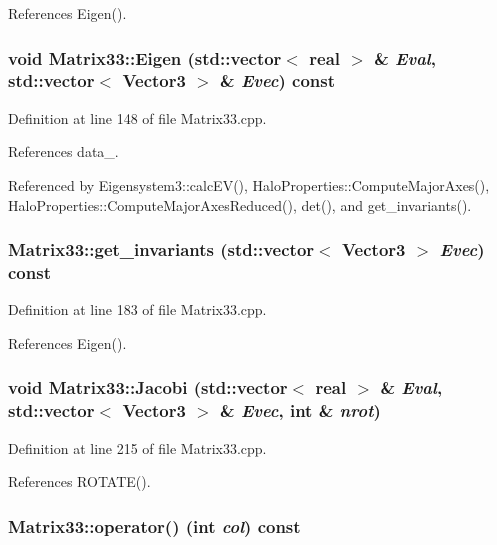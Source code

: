 References Eigen().

\subsubsection[{Eigen}]{\setlength{\rightskip}{0pt plus 5cm}void Matrix33::Eigen (std::vector$<$ {\bf real} $>$ \& {\em Eval}, \/  std::vector$<$ {\bf Vector3} $>$ \& {\em Evec}) const}\label{classMatrix33_ae7c3a2bd71ef8d0024d2d122de4a6f0b}


Definition at line 148 of file Matrix33.cpp.



References data\_\-.



Referenced by Eigensystem3::calcEV(), HaloProperties::ComputeMajorAxes(), HaloProperties::ComputeMajorAxesReduced(), det(), and get\_\-invariants().

\subsubsection[{get\_\-invariants}]{ Matrix33::get\_\-invariants (std::vector$<$ {\bf Vector3} $>$ {\em Evec}) const}\label{classMatrix33_a9aa967ea6edb9d1f4084d81600be8f38}


Definition at line 183 of file Matrix33.cpp.



References Eigen().

\subsubsection[{Jacobi}]{\setlength{\rightskip}{0pt plus 5cm}void Matrix33::Jacobi (std::vector$<$ {\bf real} $>$ \& {\em Eval}, \/  std::vector$<$ {\bf Vector3} $>$ \& {\em Evec}, \/  int \& {\em nrot})}\label{classMatrix33_a564dc34febb2c4c76718c60ff7eb5e19}


Definition at line 215 of file Matrix33.cpp.



References ROTATE().

\subsubsection[{operator()}]{ Matrix33::operator() (int {\em col}) const}\label{classMatrix33_a862f4adceda842d6dcf2caefe18e42fe}


